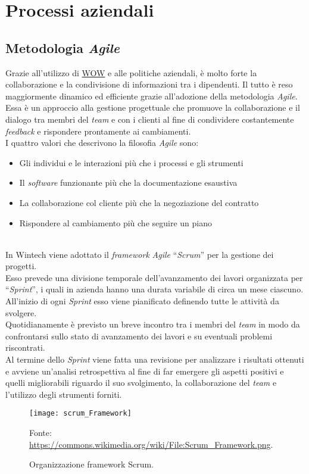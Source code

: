 \section{Processi aziendali}
\subsection{Metodologia \emph{Agile}}
Grazie all'utilizzo di \hyperref[WOW]{WOW} e alle politiche aziendali, è molto forte la collaborazione e la condivisione di informazioni tra i dipendenti. Il tutto è reso maggiormente dinamico ed efficiente grazie all'adozione della metodologia \emph{Agile}.\\
Essa è un approccio alla gestione progettuale che promuove la collaborazione e il dialogo tra membri del \emph{team} e con i clienti al fine di condividere costantemente \emph{feedback} e rispondere prontamente ai cambiamenti.\\
I quattro valori che descrivono la filosofia \emph{Agile} sono:
\begin{itemize}
    \item Gli individui e le interazioni più che i processi e gli strumenti 
    \item Il \emph{software} funzionante più che la documentazione esaustiva  
    \item La collaborazione col cliente più che la negoziazione del contratto 
    \item Rispondere al cambiamento più che seguire un piano\\\\
\end{itemize}
In Wintech viene adottato il \emph{framework} \emph{Agile} “\emph{Scrum}” per la gestione dei progetti.\\
Esso prevede una divisione temporale dell'avanzamento dei lavori organizzata per “\emph{Sprint}”, i quali in azienda hanno una durata variabile di circa un mese ciascuno.\\
All'inizio di ogni \emph{Sprint} esso viene pianificato definendo tutte le attività da svolgere.\\
Quotidianamente è previsto un breve incontro tra i membri del \emph{team} in modo da confrontarsi sullo stato di avanzamento dei lavori e su eventuali problemi riscontrati.\\
Al termine dello \emph{Sprint} viene fatta una revisione per analizzare i risultati ottenuti e avviene un'analisi retrospettiva al fine di far emergere gli aspetti positivi e quelli migliorabili riguardo il suo svolgimento, la collaborazione del \emph{team} e l'utilizzo degli strumenti forniti.\\
\begin{figure}[htbp] 
    \centering 
    \texttt{[image: scrum\_Framework]} 
    \caption{Organizzazione framework Scrum.}
    \label{fig:scrum_framework}
    \vspace{1mm}
    Fonte: \url{https://commons.wikimedia.org/wiki/File:Scrum_Framework.png}.
\end{figure}

